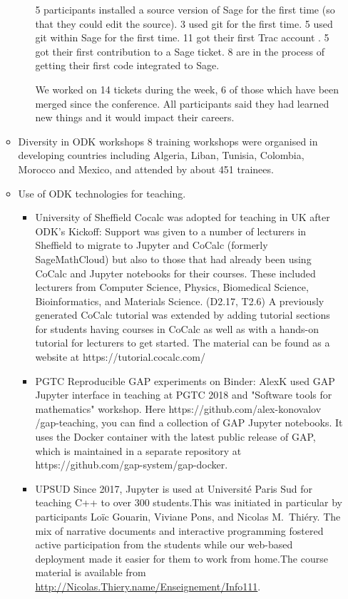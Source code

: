 \begin{enumerate}
\begin{itemize}
\begin{itemize}
    5 participants installed a source version of Sage for the first time (so that they could edit the source).
    3 used git for the first time.
    5 used git within Sage for the first time.
    11 got their first Trac account .
    5 got their first contribution to a Sage ticket.
    8 are in the process of getting their first code integrated to Sage.

We worked on 14 tickets during the week, 6 of those which have been merged since the conference. All participants said they had learned new 
things and it would impact their careers. %
\end{itemize}

\item Diversity in ODK workshops
8 training workshops were organised in developing countries including Algeria, Liban, Tunisia, Colombia, Morocco and Mexico, and attended by about 451 trainees.

\item Use of ODK technologies for teaching.
\begin{itemize}
\item University of Sheffield
Cocalc was adopted for teaching in UK after ODK's Kickoff: Support was given to a number of lecturers in Sheffield to migrate to Jupyter and 
CoCalc (formerly SageMathCloud) but also to those that had already been using CoCalc and Jupyter notebooks for their courses. These included 
lecturers from Computer Science, Physics, Biomedical Science, Bioinformatics, and Materials Science. (D2.17, T2.6) A previously generated 
CoCalc tutorial was extended by adding tutorial sections for students having courses in CoCalc as well as with a hands-on tutorial for 
lecturers to get started. The material can be found as a website at https://tutorial.cocalc.com/ 

\item PGTC 
Reproducible GAP experiments on Binder: AlexK %
used GAP Jupyter interface in teaching at PGTC 2018 and "Software tools for mathematics" workshop. Here https://github.com/alex-konovalov
/gap-teaching, you can find a collection of GAP Jupyter notebooks. It uses the Docker container with the latest public release of GAP, which 
is maintained in a separate repository at https://github.com/gap-system/gap-docker.

\item UPSUD
Since 2017, Jupyter is used at Université Paris Sud for teaching C++ to over 300 students.This was initiated in particular by
     \ODK participants Loïc Gouarin, Viviane Pons, and Nicolas M.\ Thiéry. The mix of narrative documents and interactive programming 
     fostered active participation from the students while our web-based deployment made it easier for them to work from home.The course 
     material is available from \url{http://Nicolas.Thiery.name/Enseignement/Info111}.
     

\end{itemize}
\end{itemize}
\end{enumerate}

